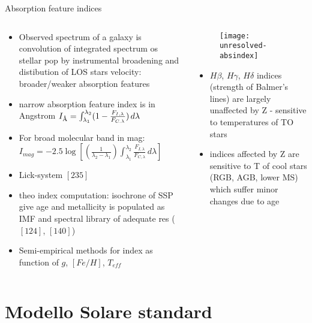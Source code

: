 \begin{frame}{Absorption feature indices}
\begin{columns}\begin{column}{0.5\textwidth}
\begin{itemize}
\item Observed spectrum of a galaxy is convolution of integrated spectrum os stellar pop by instrumental broadening and distibution of LOS stars velocity: broader/weaker absorption features
\item narrow absorption feature index is in Angstrom
$I_{\textup{\AA}}=\int_{\lambda_1}^{\lambda_2}(1-\frac{F_{I,\lambda}}{F_{C.\lambda}})\,d\lambda$
\item For broad molecular band in mag: $I_{mag}=-2.5\log{[(\frac{1}{\lambda_2-\lambda_1})\int_{\lambda_1}^{\lambda_2}\frac{F_{I,\lambda}}{F_{C,\lambda}}\,d\lambda]}$
\item Lick-system $[235]$
\item theo index computation: isochrone of SSP give age and metallicity is populated as IMF and spectral library of adequate res ($[124]$, $[140]$)
\item Semi-empirical methods for index as function of $g$, $[Fe/H]$, $T_{eff}$
\end{itemize} 
\end{column} \begin{column}{0.5\textwidth}
\begin{figure}[!ht]
\texttt{[image: unresolved-absindex]}
\end{figure}
\begin{itemize}
\item $H\beta$, $H\gamma$, $H\delta$ indices (strength of Balmer's lines) are largely unaffected by Z - sensitive to temperatures of TO stars
\item indices affected by Z are sensitive to T of cool stars (RGB, AGB, lower MS) which suffer minor changes due to age
\end{itemize}
\end{column}\end{columns}
\end{frame}

\section{Modello Solare standard}

